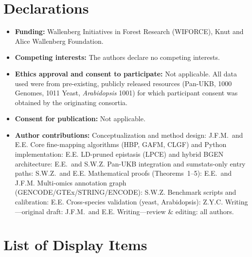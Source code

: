 \documentclass[pdflatex,sn-nature]{sn-jnl}
\begin{document}
\section*{Declarations}

\begin{itemize}
\item \textbf{Funding:} Wallenberg Initiatives in Forest Research (WIFORCE), Knut and Alice Wallenberg Foundation.
\item \textbf{Competing interests:} The authors declare no competing interests.
\item \textbf{Ethics approval and consent to participate:} Not applicable. All data used were from pre-existing, publicly released resources (Pan-UKB, 1000 Genomes, 1011 Yeast, \emph{Arabidopsis} 1001) for which participant consent was obtained by the originating consortia.
\item \textbf{Consent for publication:} Not applicable.
\item \textbf{Author contributions:} Conceptualization and method design: J.F.M.\ and E.E. Core fine-mapping algorithms (HBP, GAFM, CLGF) and Python implementation: E.E. LD-pruned epistasis (LPCE) and hybrid BGEN architecture: E.E.\ and S.W.Z. Pan-UKB integration and sumstats-only entry paths: S.W.Z.\ and E.E. Mathematical proofs (Theorems~1--5): E.E.\ and J.F.M. Multi-omics annotation graph (GENCODE/GTEx/STRING/ENCODE): S.W.Z. Benchmark scripts and calibration: E.E. Cross-species validation (yeast, Arabidopsis): Z.Y.C. Writing---original draft: J.F.M.\ and E.E. Writing---review \& editing: all authors.
\end{itemize}



\clearpage

\section*{List of Display Items}
\end{document}
